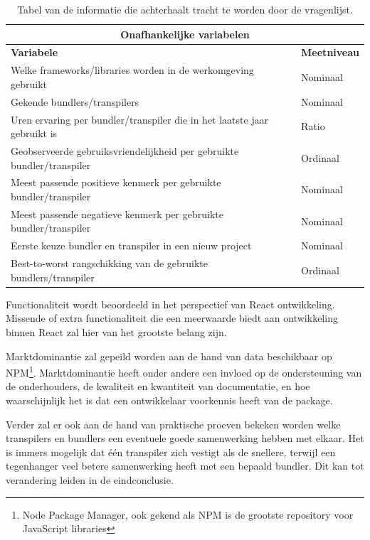\begin{table}[ht]
\begin{tabular}{|p{56mm}|l|}
\hline
\multicolumn{2}{|c|}{\textbf{Onafhankelijke variabelen}}         \\ \hline
\textbf{Variabele}                         & \textbf{Meetniveau} \\ \hline
Welke frameworks/libraries worden in de werkomgeving gebruikt& Nominaal\\ \hline
Gekende bundlers/transpilers               & Nominaal            \\ \hline
Uren ervaring per bundler/transpiler die in het laatste jaar gebruikt is& Ratio\\ \hline
Geobserveerde gebruiksvriendelijkheid per gebruikte bundler/transpiler& Ordinaal\\ \hline
Meest passende positieve kenmerk per gebruikte bundler/transpiler& Nominaal\\ \hline
Meest passende negatieve kenmerk per gebruikte bundler/transpiler& Nominaal\\ \hline
Eerste keuze bundler en transpiler in een nieuw project& Nominaal\\ \hline
Best-to-worst rangschikking van de gebruikte bundlers/transpiler& Ordinaal\\ \hline
\end{tabular}
\caption{Tabel van de informatie die achterhaalt tracht te worden door de vragenlijst.}
\label{table:1}
\end{table}

Functionaliteit wordt beoordeeld in het perspectief van React ontwikkeling. Missende of extra functionaliteit die een meerwaarde biedt aan ontwikkeling binnen React zal hier van het grootste belang zijn.

Marktdominantie zal gepeild worden aan de hand van data beschikbaar op NPM\footnote{Node Package Manager, ook gekend als NPM is de grootste repository voor JavaScript libraries}. Marktdominantie heeft onder andere een invloed op de ondersteuning van de onderhouders, de kwaliteit en kwantiteit van documentatie, en hoe waarschijnlijk het is dat een ontwikkelaar voorkennis heeft van de package.

Verder zal er ook aan de hand van praktische proeven bekeken worden welke transpilers en bundlers een eventuele goede samenwerking hebben met elkaar. Het is immers mogelijk dat één transpiler zich vestigt als de snellere, terwijl een tegenhanger veel betere samenwerking heeft met een bepaald bundler. Dit kan tot verandering leiden in de eindconclusie.

